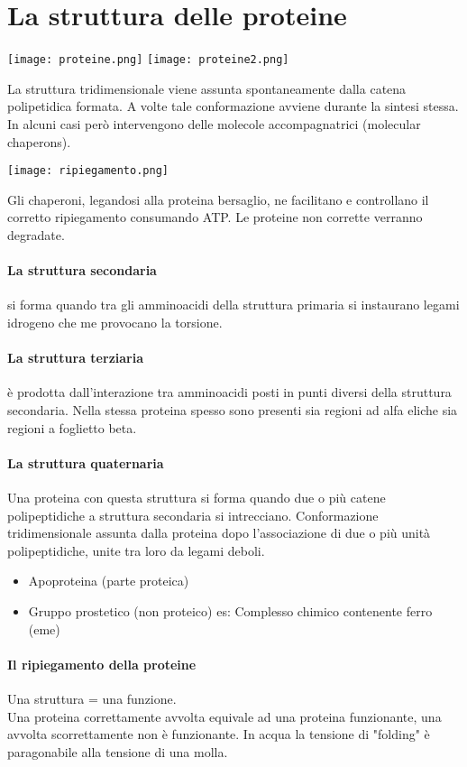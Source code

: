 \documentclass{article}
\begin{document}
\section{La struttura delle proteine}
\begin{center}
    \texttt{[image: proteine.png]}
    \texttt{[image: proteine2.png]}
\end{center}
La struttura tridimensionale viene assunta spontaneamente dalla catena polipetidica
formata. A volte tale conformazione avviene durante la sintesi stessa.
In alcuni casi però intervengono delle molecole accompagnatrici (molecular chaperons). 
\begin{center}
    \texttt{[image: ripiegamento.png]}
\end{center}
Gli chaperoni, legandosi alla proteina bersaglio, ne facilitano e controllano il corretto ripiegamento
consumando ATP. Le proteine non corrette verranno degradate.
\paragraph{La struttura secondaria} si forma quando tra gli amminoacidi della struttura primaria si instaurano legami idrogeno che me provocano la torsione.
\paragraph{La struttura terziaria} è prodotta dall'interazione tra amminoacidi posti in punti diversi della struttura secondaria. Nella stessa proteina spesso sono presenti sia regioni ad alfa
eliche sia regioni a foglietto beta.
\paragraph{La struttura quaternaria} Una proteina con questa struttura si forma quando due o più catene polipeptidiche a struttura secondaria si intrecciano. Conformazione tridimensionale assunta dalla proteina dopo l'associazione di due o 
più unità polipeptidiche, unite tra loro da legami deboli.
\begin{itemize}
    \item Apoproteina (parte proteica)
    \item Gruppo prostetico (non proteico) es: Complesso chimico contenente ferro (eme)
\end{itemize}
\paragraph{Il ripiegamento della proteine}
Una struttura = una funzione.\\
Una proteina correttamente avvolta equivale ad una proteina funzionante, una avvolta scorrettamente non è funzionante. In acqua la tensione di "folding" è paragonabile alla tensione di una molla.
\end{document}
